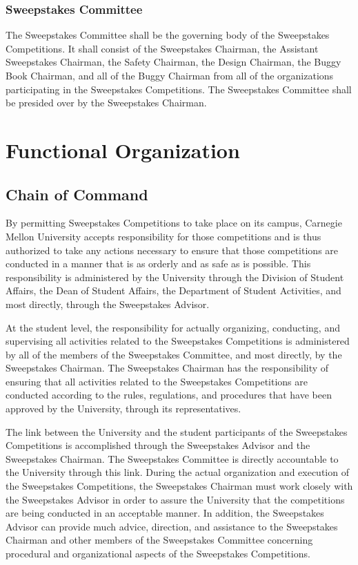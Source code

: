 \subsubsection{Sweepstakes Committee}

	The Sweepstakes Committee shall be the governing body of the Sweepstakes Competitions. It shall consist of the Sweepstakes Chairman, the Assistant Sweepstakes Chairman, the Safety Chairman, the Design Chairman, the Buggy Book Chairman, and all of the Buggy Chairman from all of the organizations participating in the Sweepstakes Competitions. The Sweepstakes Committee shall be presided over by the Sweepstakes Chairman.

\section{Functional Organization}

\subsection{Chain of Command}

	By permitting Sweepstakes Competitions to take place on its campus, Carnegie Mellon University accepts responsibility for those competitions and is thus authorized to take any actions necessary to ensure that those competitions are conducted in a manner that is as orderly and as safe as is possible. This responsibility is administered by the University through the Division of Student Affairs, the Dean of Student Affairs, the Department of Student Activities, and most directly, through the Sweepstakes Advisor.

	At the student level, the responsibility for actually organizing, conducting, and supervising all activities related to the Sweepstakes Competitions is administered by all of the members of the Sweepstakes Committee, and most directly, by the Sweepstakes Chairman. The Sweepstakes Chairman has the responsibility of ensuring that all activities related to the Sweepstakes Competitions are conducted according to the rules, regulations, and procedures that have been approved by the University, through its representatives.

	The link between the University and the student participants of the Sweepstakes Competitions is accomplished through the Sweepstakes Advisor and the Sweepstakes Chairman. The Sweepstakes Committee is directly accountable to the University through this link. During the actual organization and execution of the Sweepstakes Competitions, the Sweepstakes Chairman must work closely with the Sweepstakes Advisor in order to assure the University that the competitions are being conducted in an acceptable manner. In addition, the Sweepstakes Advisor can provide much advice, direction, and assistance to the Sweepstakes Chairman and other members of the Sweepstakes Committee concerning procedural and organizational aspects of the Sweepstakes Competitions.

